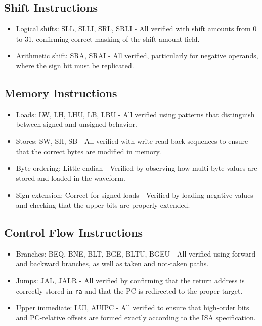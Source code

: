 \subsection{Shift Instructions}

\begin{itemize}
    \item Logical shifts: SLL, SLLI, SRL, SRLI - \checkmark All verified with shift amounts from 0 to 31, confirming correct masking of the shift amount field.
    \item Arithmetic shift: SRA, SRAI - \checkmark All verified, particularly for negative operands, where the sign bit must be replicated.
\end{itemize}

\subsection{Memory Instructions}

\begin{itemize}
    \item Loads: LW, LH, LHU, LB, LBU - \checkmark All verified using patterns that distinguish between signed and unsigned behavior.
    \item Stores: SW, SH, SB - \checkmark All verified with write-read-back sequences to ensure that the correct bytes are modified in memory.
    \item Byte ordering: Little-endian - \checkmark Verified by observing how multi-byte values are stored and loaded in the waveform.
    \item Sign extension: Correct for signed loads - \checkmark Verified by loading negative values and checking that the upper bits are properly extended.
\end{itemize}

\subsection{Control Flow Instructions}

\begin{itemize}
    \item Branches: BEQ, BNE, BLT, BGE, BLTU, BGEU - \checkmark All verified using forward and backward branches, as well as taken and not-taken paths.
    \item Jumps: JAL, JALR - \checkmark All verified by confirming that the return address is correctly stored in \texttt{ra} and that the PC is redirected to the proper target.
    \item Upper immediate: LUI, AUIPC - \checkmark All verified to ensure that high-order bits and PC-relative offsets are formed exactly according to the ISA specification.
\end{itemize}

